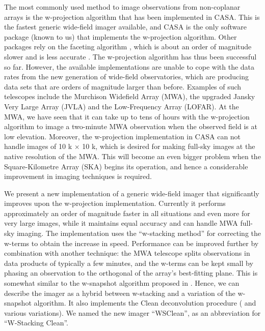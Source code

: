 \documentclass[a4paper,10pt]{article}
\begin{document}
The most commonly used method to image observations from non-coplanar arrays is the w-projection algorithm \citep{wprojection-cornwell} that has been implemented in CASA. This is the fastest generic wide-field imager available, and CASA is the only software package (known to us) that implements the w-projection algorithm. Other packages rely on the faceting algorithm \citep{facetting-cornwell}, which is about an order of magnitude slower and is less accurate \citep{wprojection-cornwell}. The w-projection algorithm has thus been successful so far. However, the available implementations are unable to cope with the data rates from the new generation of wide-field observatories, which are producing data sets that are orders of magnitude larger than before. Examples of such telescopes include the Murchison Widefield Array (MWA), the upgraded Jansky Very Large Array (JVLA) and the Low-Frequency Array (LOFAR). At the MWA, we have seen that it can take up to tens of hours with the w-projection algorithm to image a two-minute MWA observation when the observed field is at low elevation. Moreover, the w-projection implementation in CASA can not handle images of 10 k $\times$ 10 k, which is desired for making full-sky images at the native resolution of the MWA. This will become an even bigger problem when the Square-Kilometre Array (SKA) begins its operation, and hence a considerable improvement in imaging techniques is required.

We present a new implementation of a generic wide-field imager that significantly improves upon the w-projection implementation. Currently it performs approximately an order of magnitude faster in all situations and even more for very large images, while it maintains equal accuracy and can handle MWA full-sky imaging. The implementation uses the ``w-stacking method'' for correcting the w-terms \citep{widefield-imaging-ska-cornwell} to obtain the increase in speed. Performance can be improved further by combination with another technique: the MWA telescope splits observations in data products of typically a few minutes, and the w-terms can be kept small by phasing an observation to the orthogonal of the array's best-fitting plane. This is somewhat similar to the w-snapshot algorithm proposed in \citet{widefield-imaging-ska-cornwell}. Hence, we can describe the imager as a hybrid between w-stacking and a variation of the w-snapshot algorithm. It also implements the Clean deconvolution procedure (\citealt{hogbom-clean} and various variations). We named the new imager ``WSClean'', as an abbreviation for ``W-Stacking Clean''.
\end{document}
